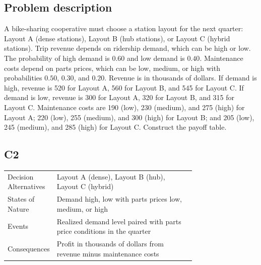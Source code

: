 

	
	\begin{ExamProblems}
		\item
		\subsection*{Problem description}
		A bike-sharing cooperative must choose a station layout for the next quarter: Layout A (dense stations),
		Layout B (hub stations), or Layout C (hybrid stations). Trip revenue depends on ridership demand,
		which can be high or low. The probability of high demand is $0.60$ and low demand is $0.40$.
		Maintenance costs depend on parts prices, which can be low, medium, or high with probabilities
		$0.50$, $0.30$, and $0.20$. Revenue is in thousands of dollars. If demand is high, revenue is 520 for Layout A,
		560 for Layout B, and 545 for Layout C. If demand is low, revenue is 300 for Layout A, 320 for Layout B,
		and 315 for Layout C. Maintenance costs are 190 (low), 230 (medium), and 275 (high) for Layout A;
		220 (low), 255 (medium), and 300 (high) for Layout B; and 205 (low), 245 (medium), and 285 (high) for Layout C.
		Construct the payoff table.
		
		\subsection*{C2}
		\begin{center}
			\begin{tabular}{l p{0.74\linewidth}}
				\toprule
				Decision Alternatives & Layout A (dense), Layout B (hub), Layout C (hybrid) \\
				States of Nature & Demand high, low with parts prices low, medium, or high \\
				Events & Realized demand level paired with parts price conditions in the quarter \\
				Consequences & Profit in thousands of dollars from revenue minus maintenance costs \\
				\bottomrule
			\end{tabular}
		\end{center}
		

\end{ExamProblems}
